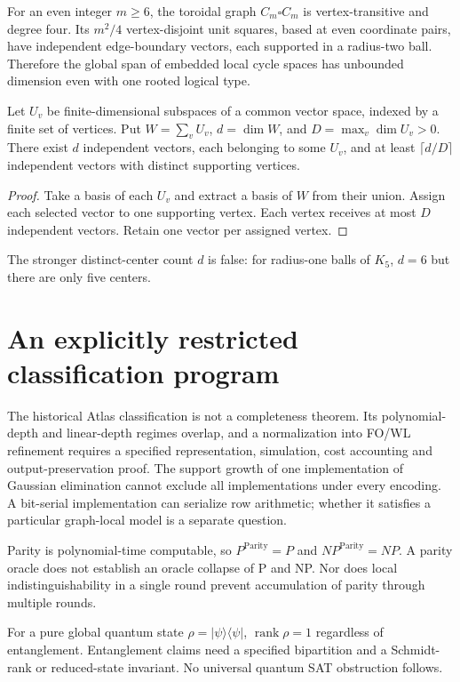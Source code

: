 For an even integer $m\ge6$, the toroidal graph $C_m\square C_m$ is vertex-transitive and degree four. Its $m^2/4$ vertex-disjoint unit squares, based at even coordinate pairs, have independent edge-boundary vectors, each supported in a radius-two ball. Therefore the global span of embedded local cycle spaces has unbounded dimension even with one rooted logical type.

\begin{theorem}
Let $U_v$ be finite-dimensional subspaces of a common vector space, indexed by a finite set of vertices. Put $W=\sum_v U_v$, $d=\dim W$, and $D=\max_v\dim U_v>0$. There exist $d$ independent vectors, each belonging to some $U_v$, and at least $\lceil d/D\rceil$ independent vectors with distinct supporting vertices.
\end{theorem}
\begin{proof}
Take a basis of each $U_v$ and extract a basis of $W$ from their union. Assign each selected vector to one supporting vertex. Each vertex receives at most $D$ independent vectors. Retain one vector per assigned vertex.
\end{proof}
The stronger distinct-center count $d$ is false: for radius-one balls of $K_5$, $d=6$ but there are only five centers.

\section{An explicitly restricted classification program}
The historical Atlas classification is not a completeness theorem. Its polynomial-depth and linear-depth regimes overlap, and a normalization into FO/WL refinement requires a specified representation, simulation, cost accounting and output-preservation proof. The support growth of one implementation of Gaussian elimination cannot exclude all implementations under every encoding. A bit-serial implementation can serialize row arithmetic; whether it satisfies a particular graph-local model is a separate question.

Parity is polynomial-time computable, so $P^{\mathrm{Parity}}=P$ and $NP^{\mathrm{Parity}}=NP$. A parity oracle does not establish an oracle collapse of P and NP\@. Nor does local indistinguishability in a single round prevent accumulation of parity through multiple rounds.

For a pure global quantum state $\rho=|\psi\rangle\langle\psi|$, $\operatorname{rank}\rho=1$ regardless of entanglement. Entanglement claims need a specified bipartition and a Schmidt-rank or reduced-state invariant. No universal quantum SAT obstruction follows.


